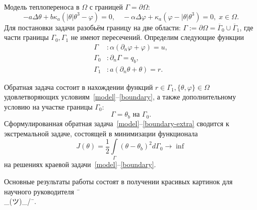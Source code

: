 Модель теплопереноса в $\Omega$ с границей $\Gamma = \partial \Omega$:
\begin{equation}
    \label{model}
    - a \Delta\theta + b\kappa_a(|\theta|\theta^3- \varphi)=0,   \quad
    - \alpha \Delta \varphi + \kappa_a(\varphi-|\theta|\theta^3)=0,\; x\in\Omega.
\end{equation}
Для постановки задачи разобьём границу на две области:
$\Gamma := \partial \Omega =\overline{\Gamma}_0 \cup \overline{\Gamma}_1$,
где части границы $\Gamma_0, \Gamma_1$ не имеют пересечений.
Определим следующие функции
\begin{equation}
    \label{boundary}
    \begin{aligned}
        \Gamma &: \alpha(\partial_n\varphi+\varphi) = u, \\
        \Gamma_0 &: \partial_n\Gamma = q_b, \\
        \Gamma_1 &: a(\partial_n\theta+\theta) = r.
    \end{aligned}
\end{equation}

Обратная задача состоит в нахождении функций $r \in  \Gamma_1, \{\theta, \varphi\} \in \Omega $
удовлетворяющих условиям~\eqref{model}--\eqref{boundary}, а также дополнительному условию
на участке границы $\Gamma_0$:
\begin{equation}
    \label{boundary-extra}
    \Gamma = \theta_b \text{ на } \Gamma_0.
\end{equation}
Сформулированная обратная задача~\eqref{model}--\eqref{boundary-extra} сводится к экстремальной задаче,
состоящей в минимизации функционала
\begin{equation}
    \label{cost}
    J(\theta) = \frac{1}{2}\int\limits_\Gamma (\theta - \theta_b)^{2} d\Gamma_0 \rightarrow \inf
\end{equation}
на решениях краевой задачи~\eqref{model}--\eqref{boundary}.

Основные результаты работы состоят в получении красивых картинок для научного руководителя ¯\\_(ツ)_/¯.